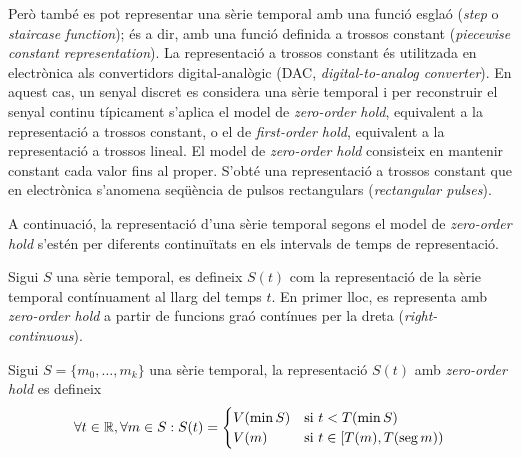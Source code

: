 Però també es pot representar una sèrie temporal amb una funció esglaó (\emph{step} o \emph{staircase function}); és a dir, amb una funció definida a trossos constant (\emph{piecewise constant representation}).
La representació a trossos constant és utilitzada en electrònica als convertidors digital-analògic (DAC, \emph{digital-to-analog converter}). En aquest cas, un senyal discret es considera una sèrie temporal i per reconstruir el senyal continu típicament s'aplica el model de \emph{zero-order hold}, equivalent a la representació a trossos constant,  o el de \emph{first-order hold},  equivalent a la representació a trossos lineal.
El model de \emph{zero-order hold} consisteix en mantenir constant cada valor fins al proper. S'obté una representació a trossos constant que en electrònica s'anomena seqüència de pulsos rectangulars (\emph{rectangular pulses}).







A continuació,  la representació  d'una sèrie temporal segons el model de \emph{zero-order hold} s'estén per diferents continuïtats en els intervals de temps de representació.

Sigui $S$ una sèrie temporal, es defineix $S(t)$ com la representació
de la sèrie temporal contínuament al llarg del temps $t$.  En primer
lloc, es representa amb \emph{zero-order hold} a partir de funcions
graó contínues per la dreta (\emph{right-continuous}).

\begin{definition}
Sigui $S=\{m_0,\ldots,m_k\}$ una sèrie temporal, la representació  $S(t)$ amb \emph{zero-order hold} es defineix
\[
\forall t \in \mathbb{R} ,\forall m \in S: S(t) =
\begin{cases}
  V(\min S) & \text{si } t < T(\min S) \\
  V(m) & \text{si }  t\in [T(m),T(\operatorname*{seg} m))
\end{cases}
\]
\end{definition}

